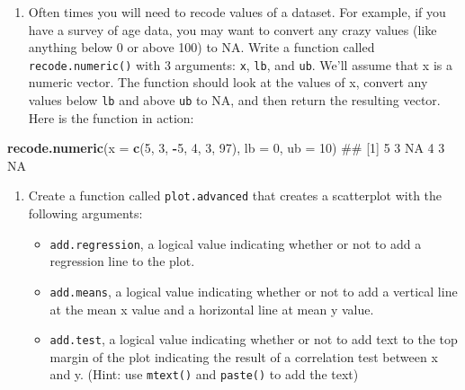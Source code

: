 \documentclass[]{book}
\newenvironment{Shaded}{\begin{snugshade}}{\end{snugshade}}
\newcommand{\KeywordTok}[1]{\textcolor[rgb]{0.13,0.29,0.53}{\textbf{#1}}}
\newcommand{\DataTypeTok}[1]{\textcolor[rgb]{0.13,0.29,0.53}{#1}}
\newcommand{\DecValTok}[1]{\textcolor[rgb]{0.00,0.00,0.81}{#1}}
\newcommand{\OperatorTok}[1]{\textcolor[rgb]{0.81,0.36,0.00}{\textbf{#1}}}
\newcommand{\NormalTok}[1]{#1}
\providecommand{\tightlist}{%
  \setlength{\itemsep}{0pt}\setlength{\parskip}{0pt}}
\theoremstyle{definition}
\theoremstyle{definition}
\theoremstyle{remark}
\begin{document}
\begin{enumerate}
\def\labelenumi{\arabic{enumi}.}
\setcounter{enumi}{2}
\tightlist
\item
  Often times you will need to recode values of a dataset. For example,
  if you have a survey of age data, you may want to convert any crazy
  values (like anything below 0 or above 100) to NA. Write a function
  called \texttt{recode.numeric()} with 3 arguments: \texttt{x},
  \texttt{lb}, and \texttt{ub}. We'll assume that x is a numeric vector.
  The function should look at the values of x, convert any values below
  \texttt{lb} and above \texttt{ub} to NA, and then return the resulting
  vector. Here is the function in action:
\end{enumerate}

\begin{Shaded}
\begin{Highlighting}[]
\KeywordTok{recode.numeric}\NormalTok{(}\DataTypeTok{x =} \KeywordTok{c}\NormalTok{(}\DecValTok{5}\NormalTok{, }\DecValTok{3}\NormalTok{, }\OperatorTok{-}\DecValTok{5}\NormalTok{, }\DecValTok{4}\NormalTok{, }\DecValTok{3}\NormalTok{, }\DecValTok{97}\NormalTok{),}
               \DataTypeTok{lb =} \DecValTok{0}\NormalTok{,}
               \DataTypeTok{ub =} \DecValTok{10}\NormalTok{)}
\NormalTok{## [1]  5  3 NA  4  3 NA}
\end{Highlighting}
\end{Shaded}

\begin{enumerate}
\def\labelenumi{\arabic{enumi}.}
\setcounter{enumi}{3}
\item
  Create a function called \texttt{plot.advanced} that creates a
  scatterplot with the following arguments:

  \begin{itemize}
  \tightlist
  \item
    \texttt{add.regression}, a logical value indicating whether or not
    to add a regression line to the plot.
  \item
    \texttt{add.means}, a logical value indicating whether or not to add
    a vertical line at the mean x value and a horizontal line at mean y
    value.
  \item
    \texttt{add.test}, a logical value indicating whether or not to add
    text to the top margin of the plot indicating the result of a
    correlation test between x and y. (Hint: use \texttt{mtext()} and
    \texttt{paste()} to add the text)
  \end{itemize}
\end{enumerate}
\end{document}
